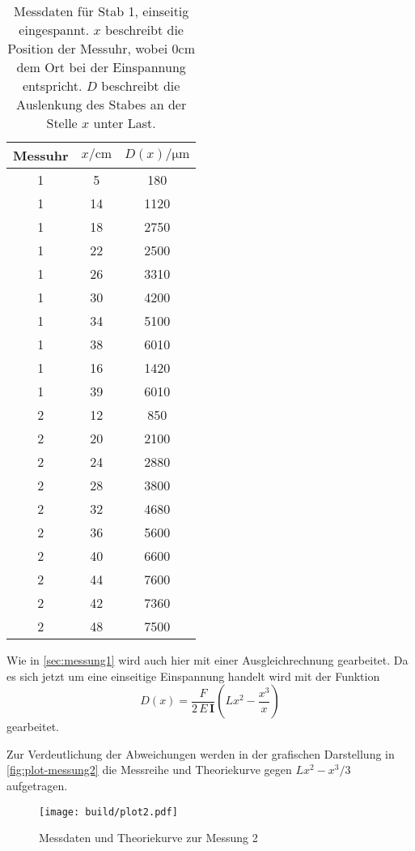 \begin{table}
	\centering
	\caption{Messdaten für Stab 1, einseitig eingespannt. $x$ beschreibt
	die Position der Messuhr, wobei $0\si{\centi\meter}$
	dem Ort bei der Einspannung entspricht.
	$D$ beschreibt die Auslenkung des Stabes an der Stelle $x$ unter Last.}
	\label{tab:messdaten2}
	\begin{tabular}{c c c}
	\toprule
	Messuhr &
	$x / \si{\centi\meter}$ &
	$D(x) / \si{\micro\meter}$
	\\
	\midrule
	1 & 5 & 180 \\
	1 & 14 & 1120 \\
	1 & 18 & 2750 \\
	1 & 22 & 2500 \\
	1 & 26 & 3310 \\
	1 & 30 & 4200 \\
	1 & 34 & 5100 \\
	1 & 38 & 6010 \\
	1 & 16 & 1420 \\
	1 & 39 & 6010 \\
	2 & 12 & 850 \\
	2 & 20 & 2100 \\
	2 & 24 & 2880 \\
	2 & 28 & 3800 \\
	2 & 32 & 4680 \\
	2 & 36 & 5600 \\
	2 & 40 & 6600 \\
	2 & 44 & 7600 \\
	2 & 42 & 7360 \\
	2 & 48 & 7500 \\
	\bottomrule
\end{tabular}
\end{table}

Wie in \autoref{sec:messung1} wird auch hier mit einer Ausgleichrechnung 
gearbeitet. Da es sich jetzt um eine einseitige Einspannung handelt wird mit der
Funktion
\begin{equation}
	D(x) = \frac{F}{2 \, E \, \mathbf{I}} \left(Lx^2 - \frac{x^3}{x} \right)
\end{equation}
gearbeitet.

Zur Verdeutlichung der Abweichungen werden in der grafischen Darstellung in
\autoref{fig:plot-messung2} die Messreihe und Theoriekurve gegen
$Lx^2 - x^3/3$ aufgetragen.
\begin{figure}[H]
	\centering
	\texttt{[image: build/plot2.pdf]}
	\caption{Messdaten und Theoriekurve zur Messung 2}
	\label{fig:plot-messung2}
\end{figure}

